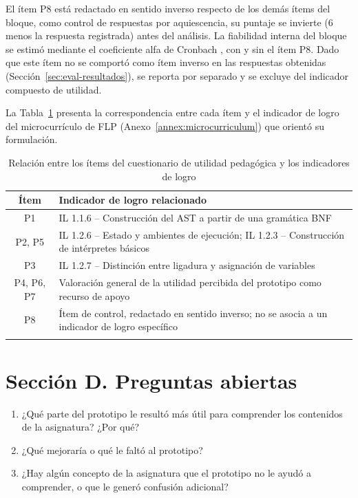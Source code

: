 El ítem P8 está redactado en sentido inverso respecto de los demás ítems del bloque, como control de respuestas por aquiescencia, su puntaje se invierte (6 menos la respuesta registrada) antes del análisis. La fiabilidad interna del bloque se estimó mediante el coeficiente alfa de Cronbach \cite{cronbach1951coefficient}, con y sin el ítem P8. Dado que este ítem no se comportó como ítem inverso en las respuestas obtenidas (Sección~\ref{sec:eval-resultados}), se reporta por separado y se excluye del indicador compuesto de utilidad.

La Tabla~\ref{tab:relacion-item-indicador} presenta la correspondencia entre cada ítem y el indicador de logro del microcurrículo de FLP (Anexo~\ref{annex:microcurriculum}) que orientó su formulación.

\begin{longtable}{|c|p{10.5cm}|}
\hline
\textbf{Ítem} & \textbf{Indicador de logro relacionado} \\
\hline
P1 & IL 1.1.6 -- Construcción del AST a partir de una gramática BNF \\
\hline
P2, P5 & IL 1.2.6 -- Estado y ambientes de ejecución; IL 1.2.3 -- Construcción de intérpretes básicos \\
\hline
P3 & IL 1.2.7 -- Distinción entre ligadura y asignación de variables \\
\hline
P4, P6, P7 & Valoración general de la utilidad percibida del prototipo como recurso de apoyo \\
\hline
P8 & Ítem de control, redactado en sentido inverso; no se asocia a un indicador de logro específico \\
\hline
\caption{Relación entre los ítems del cuestionario de utilidad pedagógica y los indicadores de logro}
\label{tab:relacion-item-indicador}
\end{longtable}

\section{Sección D. Preguntas abiertas}

\begin{enumerate}[leftmargin=*,topsep=2pt,itemsep=1pt,parsep=0pt]
    \item ¿Qué parte del prototipo le resultó más útil para comprender los contenidos de la asignatura? ¿Por qué?
    \item ¿Qué mejoraría o qué le faltó al prototipo?
    \item ¿Hay algún concepto de la asignatura que el prototipo no le ayudó a comprender, o que le generó confusión adicional?
\end{enumerate}
